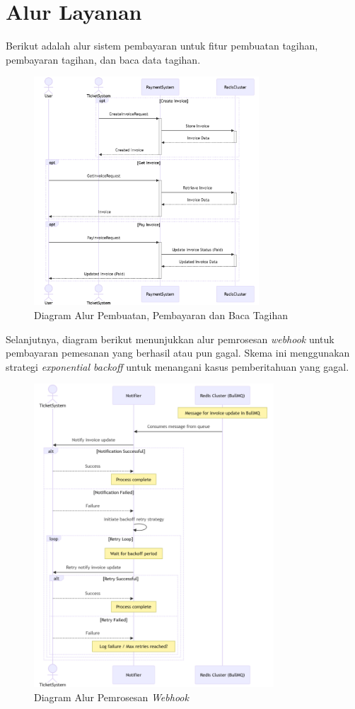 \section{Alur Layanan}

Berikut adalah alur sistem pembayaran untuk fitur pembuatan tagihan, pembayaran tagihan, dan baca data tagihan.

\begin{figure}[htbp]
    \centering
    \includegraphics[width=0.75\textwidth]{resources/chapter-3/payment-flow1.png}
    \caption{Diagram Alur Pembuatan, Pembayaran dan Baca Tagihan}
    \label{fig:payment-flow1}
\end{figure}

\pagebreak

Selanjutnya, diagram berikut menunjukkan alur pemrosesan \textit{webhook} untuk pembayaran pemesanan yang berhasil atau pun gagal. Skema ini menggunakan strategi \textit{exponential backoff} untuk menangani kasus pemberitahuan yang gagal.

\begin{figure}[htbp]
    \centering
    \includegraphics[width=0.8\textwidth]{resources/chapter-3/payment-flow2.png}
    \caption{Diagram Alur Pemrosesan \textit{Webhook}}
    \label{fig:payment-flow2}
\end{figure}